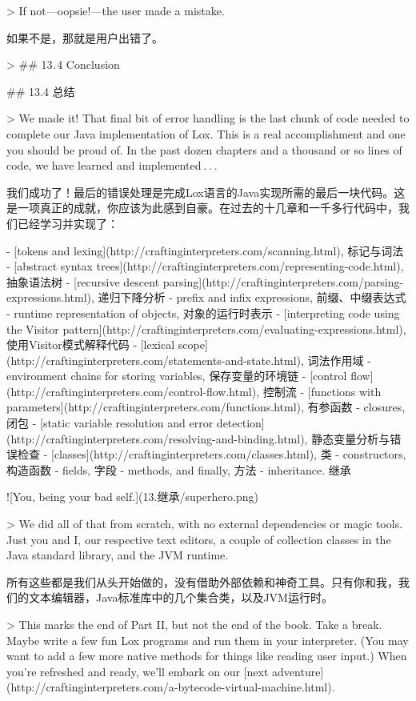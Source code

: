 \documentclass[cn,11pt,chinese]{elegantbook}
\begin{document}
> If not—oopsie!—the user made a mistake.

如果不是，那就是用户出错了。

> ## 13 . 4 Conclusion

## 13.4 总结

> We made it! That final bit of error handling is the last chunk of code needed to complete our Java implementation of Lox. This is a real accomplishment and one you should be proud of. In the past dozen chapters and a thousand or so lines of code, we have learned and implemented . . . 

我们成功了！最后的错误处理是完成Lox语言的Java实现所需的最后一块代码。这是一项真正的成就，你应该为此感到自豪。在过去的十几章和一千多行代码中，我们已经学习并实现了：

- [tokens and lexing](http://craftinginterpreters.com/scanning.html),  标记与词法
- [abstract syntax trees](http://craftinginterpreters.com/representing-code.html),  抽象语法树
- [recursive descent parsing](http://craftinginterpreters.com/parsing-expressions.html),  递归下降分析
- prefix and infix expressions,  前缀、中缀表达式
- runtime representation of objects,  对象的运行时表示
- [interpreting code using the Visitor pattern](http://craftinginterpreters.com/evaluating-expressions.html), 使用Visitor模式解释代码
- [lexical scope](http://craftinginterpreters.com/statements-and-state.html),  词法作用域
- environment chains for storing variables,  保存变量的环境链
- [control flow](http://craftinginterpreters.com/control-flow.html), 控制流
- [functions with parameters](http://craftinginterpreters.com/functions.html), 有参函数
- closures, 闭包
- [static variable resolution and error detection](http://craftinginterpreters.com/resolving-and-binding.html), 静态变量分析与错误检查
- [classes](http://craftinginterpreters.com/classes.html), 类
- constructors, 构造函数
- fields, 字段
- methods, and finally,  方法
- inheritance.  继承

![You, being your bad self.](13.继承/superhero.png)

> We did all of that from scratch, with no external dependencies or magic tools. Just you and I, our respective text editors, a couple of collection classes in the Java standard library, and the JVM runtime.

所有这些都是我们从头开始做的，没有借助外部依赖和神奇工具。只有你和我，我们的文本编辑器，Java标准库中的几个集合类，以及JVM运行时。

> This marks the end of Part II, but not the end of the book. Take a break. Maybe write a few fun Lox programs and run them in your interpreter. (You may want to add a few more native methods for things like reading user input.) When you’re refreshed and ready, we’ll embark on our [next adventure](http://craftinginterpreters.com/a-bytecode-virtual-machine.html).
\end{document}
